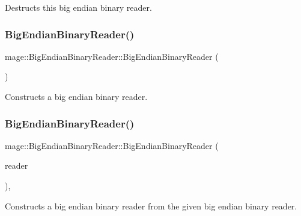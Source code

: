 Destructs this big endian binary reader. \hypertarget{classmage_1_1_big_endian_binary_reader_a1fd0dbee6950a8cb04aa399f0cdbaf2a}{}\label{classmage_1_1_big_endian_binary_reader_a1fd0dbee6950a8cb04aa399f0cdbaf2a} 
\subsubsection{\texorpdfstring{Big\+Endian\+Binary\+Reader()}{BigEndianBinaryReader()}\hspace{0.1cm}{\footnotesize\ttfamily [1/3]}}
{\footnotesize\ttfamily mage\+::\+Big\+Endian\+Binary\+Reader\+::\+Big\+Endian\+Binary\+Reader (\begin{DoxyParamCaption}{ }\end{DoxyParamCaption})\hspace{0.3cm}{\ttfamily [protected]}}

Constructs a big endian binary reader. \hypertarget{classmage_1_1_big_endian_binary_reader_a9d490263268290217ae4f2f06e0699c4}{}\label{classmage_1_1_big_endian_binary_reader_a9d490263268290217ae4f2f06e0699c4} 
\subsubsection{\texorpdfstring{Big\+Endian\+Binary\+Reader()}{BigEndianBinaryReader()}\hspace{0.1cm}{\footnotesize\ttfamily [2/3]}}
{\footnotesize\ttfamily mage\+::\+Big\+Endian\+Binary\+Reader\+::\+Big\+Endian\+Binary\+Reader (\begin{DoxyParamCaption}\item[{const \hyperlink{classmage_1_1_big_endian_binary_reader}{Big\+Endian\+Binary\+Reader} \&}]{reader }\end{DoxyParamCaption})\hspace{0.3cm}{\ttfamily [protected]}, {\ttfamily [delete]}}

Constructs a big endian binary reader from the given big endian binary reader.



